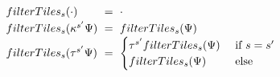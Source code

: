 \begin{figure}
  \newcommand{\spacing}{\ \ \ \ \ }
  \[
  \setlength{\fboxsep}{1pt}
  \arraycolsep=3pt\def\arraystretch{1.25}\begin{array}{lcl}
      \filterTiles{s}{\cdot} & = & \cdot \\
      \filterTiles{s}{\token^{s'}\selection} & = & \filterTiles{s}{\selection} \\
      \filterTiles{s}{\tile^{s'}\selection} & = &
        \begin{cases}
          \tile^{s'}\filterTiles{s}{\selection} & \text{ if } s = s' \\
          \filterTiles{s}{\selection} & \text{ else }
        \end{cases}
\end{array}\]
  \vspace{-2px}
  \vspace{-2px}
  \end{figure}